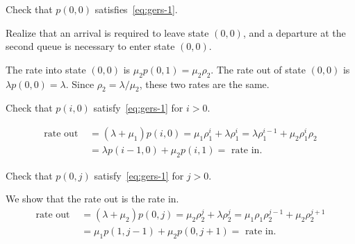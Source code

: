 \documentclass[stochastic-or.tex]{subfiles}
\begin{document}
\begin{exercise}\label{ex:72}
Check that $p(0,0)$ satisfies~\cref{eq:gers-1}.
\begin{hint}
  Realize that an arrival is required to leave state $(0,0)$, and a departure at the second queue is necessary to enter state $(0,0)$.
\end{hint}
\begin{solution}
  The rate into state $(0,0)$ is $\mu_2 p(0,1) = \mu_2 \rho_2$. The rate out of state $(0,0)$ is $\lambda p(0,0) = \lambda$. Since $\rho_2=\lambda/\mu_2$, these two rates are the same.
\end{solution}
\end{exercise}

\begin{exercise}
Check that $p(i,0)$ satisfy~\cref{eq:gers-1} for $i> 0$.
\begin{solution}
  \begin{align*}
    \text{rate out } &=(\lambda + \mu_1) p(i,0) = \mu_1 \rho_1^i + \lambda \rho_1^i = \lambda \rho_1^{i-1} + \mu_2 \rho_1^i \rho_2 \\
    &= \lambda p(i-1,0) + \mu_2 p(i, 1) = \text{ rate in}.
  \end{align*}
\end{solution}
\end{exercise}

\begin{exercise}\label{ex:75}
Check that $p(0,j)$ satisfy~\cref{eq:gers-1} for $j> 0$.
\begin{solution} We show that the rate out is the rate in.
  \begin{align*}
    \text{rate out } &=(\lambda + \mu_2) p(0, j) = \mu_2 \rho_2^j + \lambda \rho_2^j
                     = \mu_1\rho_1 \rho_2^{j-1} + \mu_2 \rho_2^{j+1} \\
    &= \mu_1 p(1,j-1) + \mu_2 p(0, j+1) = \text{ rate in}.
  \end{align*}
\end{solution}
\end{exercise}


\end{document}
